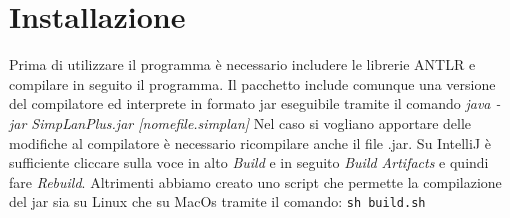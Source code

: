\documentclass[../main]{subfiles}
\begin{document}
\section{Installazione}
Prima di utilizzare il programma è necessario includere le librerie ANTLR e compilare in seguito il programma.
Il pacchetto include comunque una versione del compilatore ed interprete in formato jar eseguibile tramite il comando
\textit{java -jar SimpLanPlus.jar [nomefile.simplan] }
Nel caso si vogliano apportare delle modifiche al compilatore è necessario ricompilare anche il file .jar.
Su IntelliJ è sufficiente cliccare sulla voce in alto \textit{Build} e in seguito \textit{Build Artifacts} e quindi fare \textit{Rebuild}.
Altrimenti abbiamo creato uno script che permette la compilazione del jar sia su Linux che su MacOs tramite il comando:
\texttt{sh build.sh}
\end{document}
